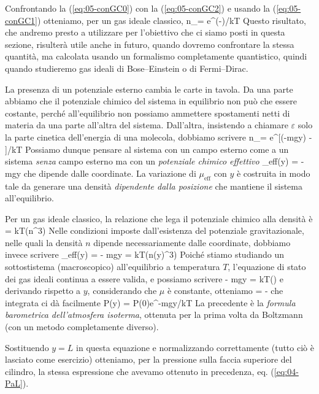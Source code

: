 Confrontando la (\ref{eq:05-conGC0}) con la (\ref{eq:05-conGC2}) e usando la (\ref{eq:05-conGC1}) otteniamo, per un gas ideale classico,
\be
\langle n_\varepsilon\rangle = e^{(\mu-\varepsilon)/kT}
\ee
Questo risultato, che andremo presto a utilizzare per l'obiettivo che ci siamo posti in questa sezione, risulterà utile anche in futuro, quando dovremo confrontare la stessa quantità, ma calcolata usando un formalismo completamente quantistico, quindi quando studieremo gas ideali di Bose--Einstein o di Fermi--Dirac.

La presenza di un potenziale esterno cambia le carte in tavola. Da una parte abbiamo che il potenziale chimico del sistema in equilibrio non può che essere costante, perché all'equilibrio non possiamo ammettere spostamenti netti di materia da una parte all'altra del sistema. Dall'altra, insistendo a chiamare $\varepsilon$ solo la parte cinetica dell'energia di una molecola, dobbiamo scrivere
\be
\langle n_\varepsilon\rangle = e^{[(\mu-mgy) - \varepsilon]/kT}
\ee
Possiamo dunque pensare al sistema con un campo esterno come a un sistema {\em senza} campo esterno ma con un {\em potenziale chimico effettivo}
\be
\mu_{\textrm{eff}}(y) = \mu - mgy
\ee
che dipende dalle coordinate. La variazione di $\mu_{\textrm{eff}}$ con $y$ è costruita in modo tale da generare una densità {\em dipendente dalla posizione} che mantiene il sistema all'equilibrio.

Per un gas ideale classico, la relazione che lega il potenziale chimico alla densità è
\be
\mu = kT\ln(n\lambda^3)
\ee
Nelle condizioni imposte dall'esistenza del potenziale gravitazionale, nelle quali la densità $n$ dipende necessariamente dalle coordinate, dobbiamo invece scrivere
\be
\mu_{\textrm{eff}}(y) = \mu - mgy = kT\ln(n(y)\lambda^3)
\ee
Poiché stiamo studiando un sottostistema (macroscopico) all'equilibrio a temperatura $T$, l'equazione di stato dei gas ideali continua a essere valida, e possiamo scrivere
\be
\mu - mgy = kT\ln\left(\right)
\ee
e derivando rispetto a $y$, considerando che $\mu$ è constante, otteniamo
\be
{} = -
\ee
che integrata ci dà facilmente
\be
P(y) = P(0)e^{-mgy/kT}
\ee
La precedente è la {\em formula barometrica dell'atmosfera isoterma}, ottenuta per la prima volta da Boltzmann (con un metodo completamente diverso).

Sostituendo $y = L$ in questa equazione e normalizzando correttamente (tutto ciò è lasciato come esercizio) otteniamo, per la pressione sulla faccia superiore del cilindro, la stessa espressione che avevamo ottenuto in precedenza, eq. (\ref{eq:04-PaL}).

